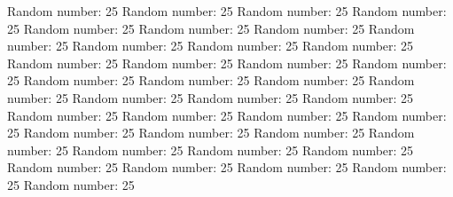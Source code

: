 \documentclass{article}%
\begin{document}
%
Random number: 25\newline%
%
Random number: 25\newline%
%
Random number: 25\newline%
%
Random number: 25\newline%
%
Random number: 25\newline%
%
Random number: 25\newline%
%
Random number: 25\newline%
%
Random number: 25\newline%
%
Random number: 25\newline%
%
Random number: 25\newline%
%
Random number: 25\newline%
%
Random number: 25\newline%
%
Random number: 25\newline%
%
Random number: 25\newline%
%
Random number: 25\newline%
%
Random number: 25\newline%
%
Random number: 25\newline%
%
Random number: 25\newline%
%
Random number: 25\newline%
%
Random number: 25\newline%
%
Random number: 25\newline%
%
Random number: 25\newline%
%
Random number: 25\newline%
%
Random number: 25\newline%
%
Random number: 25\newline%
%
Random number: 25\newline%
%
Random number: 25\newline%
%
Random number: 25\newline%
%
Random number: 25\newline%
%
Random number: 25\newline%
%
Random number: 25\newline%
%
Random number: 25\newline%
%
Random number: 25\newline%
%
Random number: 25\newline%
%
Random number: 25\newline%
%
Random number: 25\newline%
%
Random number: 25\newline%
%
Random number: 25\newline%
\end{document}
